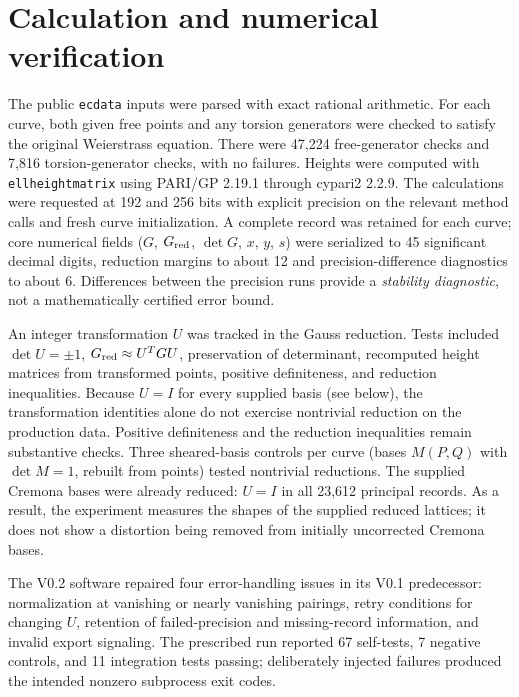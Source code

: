 \documentclass[11pt,a4paper]{article}
\begin{document}
\section{Calculation and numerical verification}\label{sec:calc}
The public \texttt{ecdata} inputs were parsed with exact rational arithmetic. For each curve, both given free points and any torsion generators were checked to satisfy the original Weierstrass equation. There were 47,224 free-generator checks and 7,816 torsion-generator checks, with no failures. Heights were computed with \texttt{ellheightmatrix} using PARI/GP 2.19.1 through cypari2 2.2.9. The calculations were requested at 192 and 256 bits with explicit precision on the relevant method calls and fresh curve initialization. A complete record was retained for each curve; core numerical fields ($G$, $G_{\rm red}$, $\det G$, $x$, $y$, $s$) were serialized to 45 significant decimal digits, reduction margins to about 12 and precision-difference diagnostics to about 6. Differences between the precision runs provide a \emph{stability diagnostic}, not a mathematically certified error bound.

An integer transformation $U$ was tracked in the Gauss reduction. Tests included $\det U=\pm1$, $G_{\rm red}\approx U^{T}GU$, preservation of determinant, recomputed height matrices from transformed points, positive definiteness, and reduction inequalities. Because $U=I$ for every supplied basis (see below), the transformation identities alone do not exercise nontrivial reduction on the production data. Positive definiteness and the reduction inequalities remain substantive checks. Three sheared-basis controls per curve (bases $M(P,Q)$ with $\det M=1$, rebuilt from points) tested nontrivial reductions. The supplied Cremona bases were already reduced: $U=I$ in all 23,612 principal records. As a result, the experiment measures the shapes of the supplied reduced lattices; it does not show a distortion being removed from initially uncorrected Cremona bases.

The V0.2 software repaired four error-handling issues in its V0.1 predecessor: normalization at vanishing or nearly vanishing pairings, retry conditions for changing $U$, retention of failed-precision and missing-record information, and invalid export signaling. The prescribed run reported 67 self-tests, 7 negative controls, and 11 integration tests passing; deliberately injected failures produced the intended nonzero subprocess exit codes.
\end{document}
